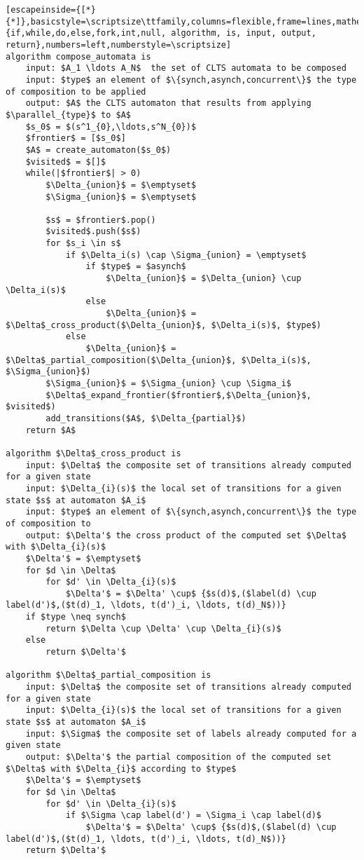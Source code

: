 \renewcommand{\ttdefault}{pcr}
\begin{lstlisting}[escapeinside={[*}{*]},basicstyle=\scriptsize\ttfamily,columns=flexible,frame=lines,mathescape=true,xleftmargin=3.0ex,keywordstyle=\textbf,morekeywords={if,while,do,else,fork,int,null, algorithm, is, input, output, return},numbers=left,numberstyle=\scriptsize]
algorithm compose_automata is
	input: $A_1 \ldots A_N$  the set of CLTS automata to be composed
	input: $type$ an element of $\{synch,asynch,concurrent\}$ the type of composition to be applied
	output: $A$ the CLTS automaton that results from applying $\parallel_{type}$ to $A$
	$s_0$ = $(s^1_{0},\ldots,s^N_{0})$
	$frontier$ = [$s_0$]
	$A$ = create_automaton($s_0$)
	$visited$ = $[]$
	while(|$frontier$| > 0)
		$\Delta_{union}$ = $\emptyset$
		$\Sigma_{union}$ = $\emptyset$		
		
		$s$ = $frontier$.pop()
		$visited$.push($s$)
		for $s_i \in s$ 
			if $\Delta_i(s) \cap \Sigma_{union} = \emptyset$		
				if $type$ = $asynch$
					$\Delta_{union}$ = $\Delta_{union} \cup \Delta_i(s)$
				else
					$\Delta_{union}$ = $\Delta$_cross_product($\Delta_{union}$, $\Delta_i(s)$, $type$)
			else
				$\Delta_{union}$ = $\Delta$_partial_composition($\Delta_{union}$, $\Delta_i(s)$, $\Sigma_{union}$)
		$\Sigma_{union}$ = $\Sigma_{union} \cup \Sigma_i$
		$\Delta$_expand_frontier($frontier$,$\Delta_{union}$, $visited$)				
		add_transitions($A$, $\Delta_{partial}$)
	return $A$

algorithm $\Delta$_cross_product is
	input: $\Delta$ the composite set of transitions already computed for a given state
	input: $\Delta_{i}(s)$ the local set of transitions for a given state $s$ at automaton $A_i$
	input: $type$ an element of $\{synch,asynch,concurrent\}$ the type of composition to	
	output: $\Delta'$ the cross product of the computed set $\Delta$ with $\Delta_{i}(s)$
	$\Delta'$ = $\emptyset$
	for $d \in \Delta$
		for $d' \in \Delta_{i}(s)$
			$\Delta'$ = $\Delta' \cup$ {$s(d)$,($label(d) \cup label(d')$,($t(d)_1, \ldots, t(d')_i, \ldots, t(d)_N$))}
	if $type \neq synch$
		return $\Delta \cup \Delta' \cup \Delta_{i}(s)$
	else
		return $\Delta'$
	
algorithm $\Delta$_partial_composition is
	input: $\Delta$ the composite set of transitions already computed for a given state
	input: $\Delta_{i}(s)$ the local set of transitions for a given state $s$ at automaton $A_i$
	input: $\Sigma$ the composite set of labels already computed for a given state		
	output: $\Delta'$ the partial composition of the computed set $\Delta$ with $\Delta_{i}$ according to $type$
	$\Delta'$ = $\emptyset$
	for $d \in \Delta$
		for $d' \in \Delta_{i}(s)$
			if $\Sigma \cap label(d') = \Sigma_i \cap label(d)$
				$\Delta'$ = $\Delta' \cup$ {$s(d)$,($label(d) \cup label(d')$,($t(d)_1, \ldots, t(d')_i, \ldots, t(d)_N$))}
	return $\Delta'$
				

\end{lstlisting}